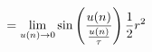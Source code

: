 \documentclass[preview]{standalone}
\begin{document}
\begin{align*}
= \lim_{u(n) \to 0} \sin \left( u(n) \over {\frac {u(n)}{\tau} }\right) \frac {1} {2} r^2
\end{align*}
\end{document}
